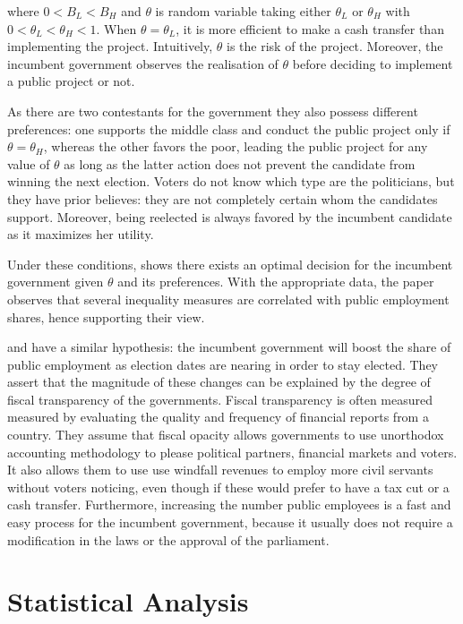 where $0 < B_L < B_H$ and \(\theta\) is random variable taking either
\(\theta_L\) or \(\theta_H\) with \(0 < \theta_L < \theta_H < 1\). When
\(\theta=\theta_L\), it is more efficient to make a cash transfer than
implementing the project. Intuitively, $\theta$ is the risk of the
project. Moreover, the incumbent government observes the realisation of
\(\theta\) before deciding to implement a public project or not.

As there are two contestants for the government they also possess different
preferences: one supports the middle class and conduct the public project only
if \(\theta = \theta_H\), whereas the other favors the poor, leading the public
project for any value of \(\theta\) as long as the latter action does not
prevent the candidate from winning the next election.  Voters do not know which
type are the politicians, but they have prior believes: they are not completely
certain whom the candidates support. Moreover, being reelected is always
favored by the incumbent candidate as it maximizes her utility.

Under these conditions, \cite{alesina2000redistributive} shows there exists an
optimal decision for the incumbent government given $\theta$ and its
preferences. With the appropriate data, the paper observes that several
inequality measures are correlated with public employment shares, hence
supporting their view.

\cite{alt2014isn} and \cite{aaskoven2015fiscal} have a similar hypothesis: the
incumbent government will boost the share of public employment as election
dates are nearing in order to stay elected. They assert that the magnitude of
these changes can be explained by the degree of fiscal transparency of the
governments. Fiscal transparency is often measured measured by evaluating the
quality and frequency of financial reports from a country. They assume that
fiscal opacity allows governments to use unorthodox accounting methodology to
please political partners, financial markets and voters. It also allows them to
use use windfall revenues to employ more civil servants without voters
noticing, even though if these would prefer to have a tax cut or a cash
transfer. Furthermore, increasing the number public employees is a fast and
easy process for the incumbent government, because it usually does not require
a modification in the laws or the approval of the parliament.


\section{Statistical Analysis}

